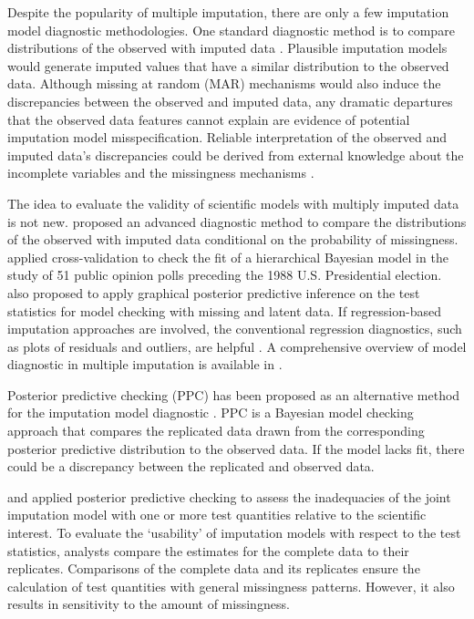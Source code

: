 	Despite the popularity of multiple imputation, there are only a few imputation model diagnostic methodologies. One standard diagnostic method is to compare distributions of the observed with imputed data \citep{Buuren2018, abayomi2008diagnostics}. Plausible imputation models would generate imputed values that have a similar distribution to the observed data. Although missing at random (MAR) mechanisms would also induce the discrepancies between the observed and imputed data, any dramatic departures that the observed data features cannot explain are evidence of potential imputation model misspecification. Reliable interpretation of the observed and imputed data's discrepancies could be derived from external knowledge about the incomplete variables and the missingness mechanisms \citep{abayomi2008diagnostics}. 
	
	The idea to evaluate the validity of scientific models with multiply imputed data is not new. \citet{bondarenko2016graphical} proposed an advanced diagnostic method to compare the distributions of the observed with imputed data conditional on the probability of missingness. \citet{gelman1998not} applied cross-validation to check the fit of a hierarchical Bayesian model in the study of 51 public opinion polls preceding the 1988 U.S. Presidential election. \citet{gelman2005multiple} also proposed to apply graphical posterior predictive inference on the test statistics for model checking with missing and latent data. If regression-based imputation approaches are involved, the conventional regression diagnostics, such as plots of residuals and outliers, are helpful \citep{white2011multiple}. A comprehensive overview of model diagnostic in multiple imputation is available in \citet{nguyen2017model}.
	
	Posterior predictive checking (PPC) has been proposed as an alternative method for the imputation model diagnostic \citep{gelman2005multiple, he2012diagnosing, nguyen2015posterior}. PPC is a Bayesian model checking approach that compares the replicated data drawn from the corresponding posterior predictive distribution to the observed data. If the model lacks fit, there could be a discrepancy between the replicated and observed data. 
	
	\citet{he2012diagnosing} and \citet{nguyen2015posterior} applied posterior predictive checking to assess the inadequacies of the joint imputation model with one or more test quantities relative to the scientific interest. To evaluate the `usability' of imputation models with respect to the test statistics, analysts compare the estimates for the complete data to their replicates. Comparisons of the complete data and its replicates ensure the calculation of test quantities with general missingness patterns. However, it also results in sensitivity to the amount of missingness.    
	
